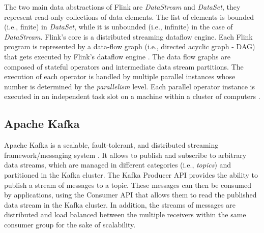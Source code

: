 \par The two main data abstractions of Flink are \textit{DataStream} and \textit{DataSet},  they represent read-only collections of data elements. The list of elements is bounded (i.e., finite) in \textit{DataSet}, while it is unbounded (i.e., infinite) in the case of \textit{DataStream}. Flink's core is a distributed streaming dataflow engine. Each
Flink program is represented by a data-flow graph (i.e., directed acyclic graph - DAG) that gets executed by Flink's dataflow engine \cite{carbone2015apache}. The data flow graphs are composed of stateful operators and intermediate data stream partitions.  The execution of each operator is handled by multiple parallel instances whose number is determined by the \textit{parallelism} level. Each parallel operator instance is executed in an independent task slot on a machine within a cluster of computers \cite{Flink}.    

\subsection{Apache Kafka}

\par Apache Kafka is a scalable, fault-tolerant, and distributed streaming framework/messaging system \cite{Kafka}. It allows to publish and subscribe to arbitrary data streams, which are managed in different categories (i.e., \textit{topics}) and  partitioned in the Kafka cluster. The Kafka Producer API provides the ability to publish a stream of messages to a topic. These messages can then be consumed by applications, using the Consumer API that allows them to read the published data stream in the Kafka cluster. In addition, the streams of messages are distributed and load balanced between the multiple receivers within the same consumer group for the sake of scalability.
  





%
